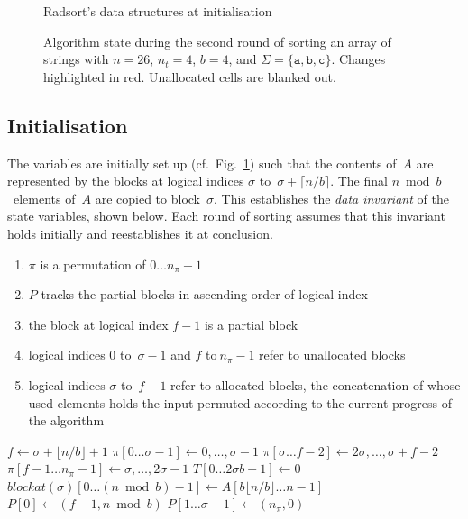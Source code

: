 \documentclass[nolineno,a4paper,UKenglish,cleveref, autoref, thm-restate]{socg-lipics-v2021}
\def\blockat{\textit{blockat}}
\begin{document}
\begin{figure}[p]
\begin{centering}

\end{centering}
\caption{Radsort's data structures at initialisation} \label{fig:datalayout}
\end{figure}

\begin{figure}[p]
\centering%

\caption{Algorithm state during the second round of sorting an array of strings
with $n=26$, $n_t=4$, $b=4$, and $\Sigma=\{\texttt a, \texttt b, \texttt c\}$.
Changes highlighted in red.
Unallocated cells are blanked out.} \label{fig:sortphase}
\end{figure}

\subsection{Initialisation} \label{sec:init}
The variables are initially set up (cf.~Fig.~\ref{fig:datalayout}) such that the contents of~$A$ are represented by
the blocks at logical indices $\sigma$ to~$\sigma+\lceil n/b\rceil$.
The final $n\bmod b$~elements of~$A$ are copied to block~$\sigma$.
This establishes the \emph{data invariant} of the state variables,
shown below.  Each round of sorting assumes that this invariant holds
initially and reestablishes it at conclusion.

\begin{enumerate}
\item $\pi$ is a permutation of $0\ldots n_\pi-1$
\item $P$ tracks the partial blocks in ascending order of logical index
\item the block at logical index $f-1$ is a partial block
\item logical indices $0$ to~$\sigma-1$ and $f$ to$~n_\pi-1$ refer to unallocated blocks
\item logical indices $\sigma$ to~$f-1$ refer to allocated blocks, the concatenation of whose
used elements holds the input permuted according to the current progress of the algorithm
\end{enumerate}

\begin{algorithm}
\caption{initialisation of variables}\label{alg:setup}
\begin{algorithmic}[1]
\State$f\gets\sigma+\lfloor n/b\rfloor+1$
\State$\pi[0\ldots\sigma-1]\gets0,\ldots,\sigma-1$
\State$\pi[\sigma\ldots f-2]\gets2\sigma,\ldots,\sigma+f-2$
\State$\pi[f-1\ldots n_\pi-1]\gets\sigma,\ldots,2\sigma-1$
\State$T[0\dots2\sigma b-1]\gets0$
\State$\blockat(\sigma)[0\dots(n\bmod b)-1]\gets A[b\lfloor n/b\rfloor\ldots n-1]$
\State$P[0]\gets(f-1,n\bmod b)$
\State$P[1\ldots\sigma-1]\gets(n_\pi,0)$
\EndProcedure
\end{algorithmic}
\end{algorithm}
\end{document}
